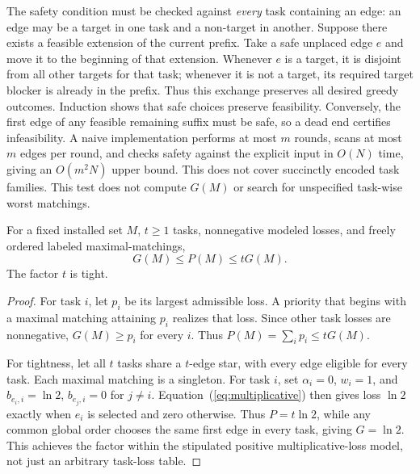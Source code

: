 \documentclass[sigconf, nonacm]{acmart}
\begin{document}
The safety condition must be checked against
\emph{every} task containing an edge: an edge may be
a target in one task and a non-target in another.
Suppose there exists a feasible extension of the
current prefix. Take a safe unplaced edge $e$ and move it to
the beginning of that extension. Whenever $e$ is a
target, it is disjoint from all other targets for
that task; whenever it is not a target, its required
target blocker is already in the prefix. Thus this
exchange preserves all desired greedy outcomes.
Induction shows that safe choices preserve feasibility.
Conversely, the first edge of any feasible remaining
suffix must be safe, so a dead end certifies
infeasibility. A naive implementation performs at most $m$ rounds,
scans at most $m$ edges per round, and checks
safety against the explicit input in $O(N)$ time,
giving an $O(m^2N)$ upper bound. This does not
cover succinctly encoded task families. This test does not compute $G(M)$ or
search for unspecified task-wise worst matchings.

\begin{proposition}
\label{prop:taskfactor}
For a fixed installed set \(M\), \(t\geq1\) tasks,
nonnegative modeled losses, and freely ordered
labeled maximal-matchings,
\[
G(M)\leq P(M)\leq tG(M).
\]
The factor \(t\) is tight.
\end{proposition}
\begin{proof}
For task \(i\), let \(p_i\) be its largest
admissible loss. A priority that begins with
a maximal matching attaining \(p_i\) realizes
that loss. Since other task losses are
nonnegative, \(G(M)\geq p_i\) for every \(i\).
Thus \(P(M)=\sum_i p_i\leq tG(M)\).

For tightness, let all $t$ tasks share a
$t$-edge star, with every edge eligible for every task.
Each maximal matching is a singleton. For task $i$,
set $\alpha_i=0$, $w_i=1$, and
$b_{e_i,i}=\ln 2$, $b_{e_j,i}=0$ for $j\ne i$.
Equation~(\ref{eq:multiplicative}) then gives loss
$\ln 2$ exactly when $e_i$ is selected and zero
otherwise. Thus $P=t\ln 2$, while any common
global order chooses the same first edge in every
task, giving $G=\ln 2$. This achieves the factor
within the stipulated positive multiplicative-loss
model, not just an arbitrary task-loss table.
\end{proof}
\end{document}
